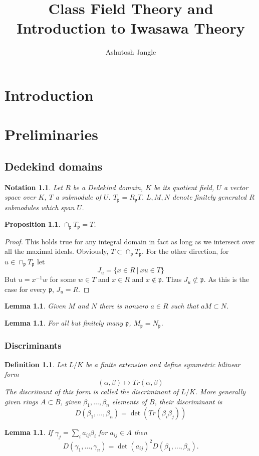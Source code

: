 \documentclass[twoside, 12pt]{iiser-thesis}
\title{Class Field Theory and Introduction to Iwasawa Theory}
\author{Ashutosh Jangle}
\newtheorem{prop}[thm]{ Proposition}
\newtheorem{lem}[thm]{ Lemma}
\newtheorem{defi}{ Definition}[section]
\newtheorem{notation}{ Notation}[section]
\begin{document}
	\thesisfront
	
\chapter*{Introduction}

\chapter{Preliminaries}
\section{Dedekind domains}
\begin{notation}
    Let $R$ be a Dedekind domain, $K$ be its quotient field, $U$ a vector space over $K$, $T$ a submodule of $U$. $T_\mathfrak p = R_\mathfrak p T$. $L,M,N$ denote finitely generated $R$ submodules which span $U$.
\end{notation}
\begin{prop}
$\cap _\mathfrak p T_\mathfrak p = T$.
\end{prop}	
\begin{proof}
This holds true for any integral domain in fact as long as we intersect over all the maximal ideals.
\newline 
Obviously, $T \subset \cap _\mathfrak p T_\mathfrak p$. For the other direction, for $u\in \cap _\mathfrak p T_\mathfrak p$ let $$ J_u = \{x \in R \ \big | \  xu \in T \}$$ But $u=x^{-1}w$ for some $w\in T$ and $x \in R$ and $x\notin \mathfrak p$. Thus $J_u \not \subset \mathfrak p$. As this is the case for every $\mathfrak p$, $J_u=R$. 
\end{proof}
\begin{lem}
Given $M$ and $N$ there is nonzero $a\in R$ such that $aM \subset N$.
\end{lem}
\begin{lem}
For all but finitely many $\mathfrak p$, $M_\mathfrak p = N_\mathfrak p$.
\end{lem}

\subsection{Discriminants}
\begin{defi}
Let $L/K$ be a finite extension and define symmetric bilinear form $$(\alpha, \beta ) \mapsto Tr(\alpha, \beta)$$The discriinant of this form is called the discriminant of $L/K$. 
 \newline More generally given rings $A \subset B$, given $\beta _1, \dots , \beta _n$ elements of $B$, their discriminant is $$D(\beta _1, \dots , \beta _n) = \det (Tr(\beta _i \beta _j))$$ 
\end{defi}
\begin{lem}
If $\gamma _j = \sum _i a_{ij}\beta _i$ for $a_{ij}\in A$ then $$D(\gamma _1, \dots , \gamma _n) = \det (a_{ij})^2 D(\beta _1, \dots , \beta _n).$$
\end{lem}
\end{document}
